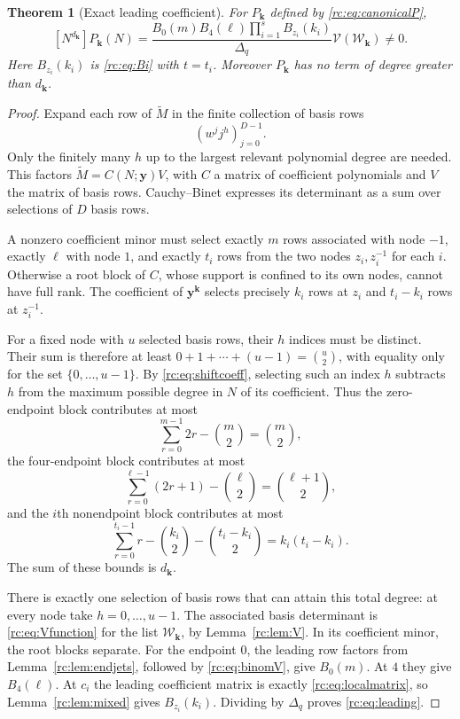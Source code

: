 \documentclass[11pt,a4paper]{article}
\numberwithin{equation}{section}
\newtheorem{theorem}{Theorem}[section]
\theoremstyle{definition}
\theoremstyle{remark}
\newcommand{\bk}{\boldsymbol{k}}
\newcommand{\by}{\boldsymbol{y}}
\newcommand{\V}{\mathcal V}
\begin{document}
\begin{theorem}[Exact leading coefficient]\label{rc:thm:leading}
For $P_{\bk}$ defined by \eqref{rc:eq:canonicalP},
\begin{equation}\label{rc:eq:leading}
 \boxed{\quad
 [N^{d_{\bk}}]P_{\bk}(N)=
  \frac{B_0(m)B_4(\ell)\prod_{i=1}^{s}B_{z_i}(k_i)}{\Delta_q}
                    \V(\mathcal W_{\bk})\ne0.
 \quad}
\end{equation}
Here $B_{z_i}(k_i)$ is \eqref{rc:eq:Bi} with $t=t_i$.
Moreover $P_{\bk}$ has no term of degree greater than $d_{\bk}$.
\end{theorem}
\begin{proof}
Expand each row of $\widetilde M$ in the finite collection of basis
rows
\begin{equation}\label{rc:eq:basis}
       (w^j j^h)_{j=0}^{D-1}.
\end{equation}
Only the finitely many $h$ up to the largest relevant polynomial degree
are needed.  This factors $\widetilde M=C(N;\by)V$, with $C$ a matrix
of coefficient polynomials and $V$ the matrix of basis rows.
Cauchy--Binet expresses its determinant as a sum over selections of
$D$ basis rows.

A nonzero coefficient minor must select exactly $m$ rows associated
with node $-1$, exactly $\ell$ with node $1$, and exactly $t_i$ rows
from the two nodes $z_i,z_i^{-1}$ for each $i$.  Otherwise a root block
of $C$, whose support is confined to its own nodes, cannot have full
rank.  The coefficient of $\by^{\bk}$ selects precisely $k_i$ rows
at $z_i$ and $t_i-k_i$ rows at $z_i^{-1}$.

For a fixed node with $u$ selected basis rows, their $h$ indices must
be distinct.  Their sum is therefore at least
$0+1+\cdots+(u-1)=\binom u2$, with equality only for the set
$\{0,\ldots,u-1\}$.  By \eqref{rc:eq:shiftcoeff}, selecting such an
index $h$ subtracts $h$ from the maximum possible degree in $N$ of
its coefficient.  Thus the zero-endpoint block contributes at most
\[
 \sum_{r=0}^{m-1}2r-\binom m2=\binom m2,
\]
the four-endpoint block contributes at most
\[
 \sum_{r=0}^{\ell-1}(2r+1)-\binom\ell2=\binom{\ell+1}2,
\]
and the $i$th nonendpoint block contributes at most
\[
 \sum_{r=0}^{t_i-1}r-\binom{k_i}2-\binom{t_i-k_i}2
           =k_i(t_i-k_i).
\]
The sum of these bounds is $d_{\bk}$.

There is exactly one selection of basis rows that can attain this
total degree: at every node take $h=0,\ldots,u-1$.  The associated
basis determinant is \eqref{rc:eq:Vfunction} for the list
$\mathcal W_{\bk}$, by Lemma~\ref{rc:lem:V}.
In its coefficient minor, the root blocks separate.  For the endpoint
$0$, the leading row factors from Lemma~\ref{rc:lem:endjets}, followed by
\eqref{rc:eq:binomV}, give $B_0(m)$.  At $4$ they give $B_4(\ell)$.
At $c_i$ the leading coefficient matrix is exactly
\eqref{rc:eq:localmatrix}, so Lemma~\ref{rc:lem:mixed} gives $B_{z_i}(k_i)$.
Dividing by $\Delta_q$ proves \eqref{rc:eq:leading}.


\end{proof}
\end{document}
